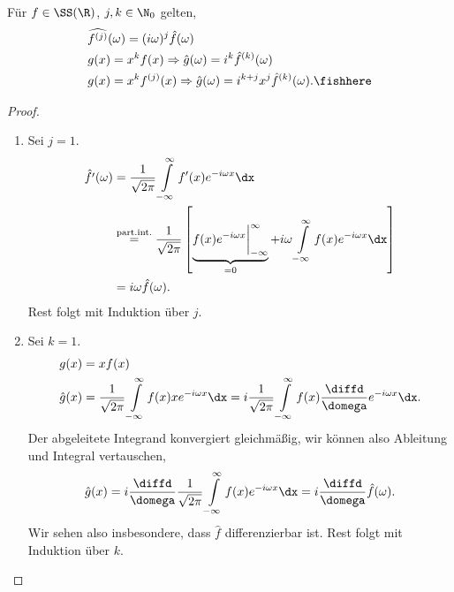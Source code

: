 \begin{prop}
\label{prop:2.8}
Für $f\in\SS(\R)$, $j,k\in\N_0$ gelten,
\begin{align*}
&\widehat{f^{(j)}}(\omega) = (i\omega)^j\hat{f}(\omega)\\
&g(x) = x^kf(x) \Rightarrow \hat{g}(\omega) = i^k\hat{f}^{(k)}(\omega)\\
&g(x) = x^kf^{(j)}(x) \Rightarrow \hat{g}(\omega) =
i^{k+j}x^j\hat{f}^{(k)}(\omega).\fishhere
\end{align*}
\end{prop}
\begin{proof}
\begin{enumerate}[label=\arabic{*}.)]
  \item Sei $j=1$.
\begin{align*}
\hat{f'}(\omega) &= \frac{1}{\sqrt{2\pi}}\int\limits_{-\infty}^\infty
f'(x)e^{-i\omega x}\dx\\
&\overset{\small\text{part.int.}} =
\frac{1}{\sqrt{2\pi}} \left[ \underbrace{f(x)e^{-i\omega
x}\bigg|_{-\infty}^\infty}_{=0} + i\omega \int\limits_{-\infty}^\infty
f(x)e^{-i\omega x}\dx \right]\\
&= i\omega \hat{f}(\omega).
\end{align*}
Rest folgt mit Induktion über $j$.
\item Sei $k=1$.
\begin{align*}
&g(x) = xf(x)\\
&\hat{g}(x) = \frac{1}{\sqrt{2\pi}}\int\limits_{-\infty}^\infty
f(x)xe^{-i\omega x}\dx = i\frac{1}{\sqrt{2\pi}}\int\limits_{-\infty}^\infty
f(x)\frac{\diffd}{\domega} e^{-i\omega x}\dx.
\end{align*}
Der abgeleitete Integrand konvergiert gleichmäßig, wir können also Ableitung
und Integral vertauschen,
\begin{align*}
\hat{g}(x) =
i \frac{\diffd}{\domega} \frac{1}{\sqrt{2\pi}}\int\limits_{-\infty}^\infty f(x)
e^{-i\omega x}\dx
= i\frac{\diffd}{\domega} \hat{f}(\omega).
\end{align*}
Wir sehen also insbesondere, dass $\hat{f}$ differenzierbar ist. Rest folgt mit
Induktion über $k$.\qedhere
\end{enumerate}
\end{proof}

